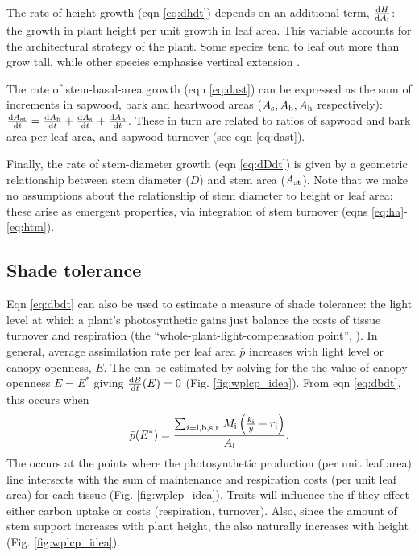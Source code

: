 \documentclass[a4paper,11pt]{article}
\begin{document}
The rate of height growth (eqn \ref{eq:dhdt}) depends on an additional term, $\frac{{\rm d}H }{{\rm d}A_{\rm l}}$: the growth in plant height per unit growth in leaf area. This variable accounts for the architectural strategy of the plant. Some species tend to leaf out more than grow tall, while other species emphasise vertical extension \citep{Poorter-2006}.

The rate of stem-basal-area growth (eqn \ref{eq:dast}) can be expressed as the sum of increments in sapwood, bark and heartwood areas ($A_{\rm s}, A_{\rm b}, A_{\rm h}$ respectively): $\frac{{\rm d}A_{\rm st}}{{\rm d}t}= \frac{{\rm d}A_{\rm b}}{{\rm d}t} + \frac{{\rm d}A_{\rm s}}{{\rm d}t} + \frac{{\rm d}A_{\rm h}}{{\rm d}t}$. These in turn are related to ratios of sapwood and bark area per leaf area, and sapwood turnover (see eqn \ref{eq:dast}).

Finally, the rate of stem-diameter growth (eqn \ref{eq:dDdt}) is given by a geometric relationship between stem diameter ($D$) and stem area ($A_{\rm st}$). Note that we make no assumptions about the relationship of stem diameter to height or leaf area: these arise as emergent properties, via integration of stem turnover (eqns \ref{eq:ha}- \ref{eq:htm}).

\subsection{Shade tolerance}

Eqn \ref{eq:dbdt} can also be used to estimate a measure of shade tolerance: the light level at which a plant's photosynthetic gains just balance the costs of tissue turnover and respiration \citep{Givnish-1988, Baltzer-2007, Lusk-2013} (the ``whole-plant-light-compensation point'', {\wplcp}). In general, average assimilation rate per leaf area $\bar{p}$ increases with light level or canopy openness, $E$. The {\wplcp} can be estimated by solving for the the value of canopy openness $E=E^*$ giving $\frac{{\rm d}B} {{\rm d}t}(E)=0$ (Fig. \ref{fig:wplcp_idea}). From eqn \ref{eq:dbdt}, this occurs when
\begin{equation}\label{eq:wplcp}
\bar{p}(E^*) =\frac{\sum_{i={\rm l,b,s,r}} \, M_{\rm i} \left(\frac{k_{\rm i}}{y} + r_{\rm i}\right)}{A_{\rm l}}.
\end{equation}
The {\wplcp} occurs at the points where the photosynthetic production (per unit leaf area) line intersects with the sum of maintenance and respiration costs (per unit leaf area) for each tissue (Fig. \ref{fig:wplcp_idea}). Traits will influence the {\wplcp} if they effect either carbon uptake or costs (respiration, turnover). Also, since the amount of stem support increases with plant height, the {\wplcp} also naturally increases with height \citep{Givnish-1988} (Fig. \ref{fig:wplcp_idea}).
\end{document}
